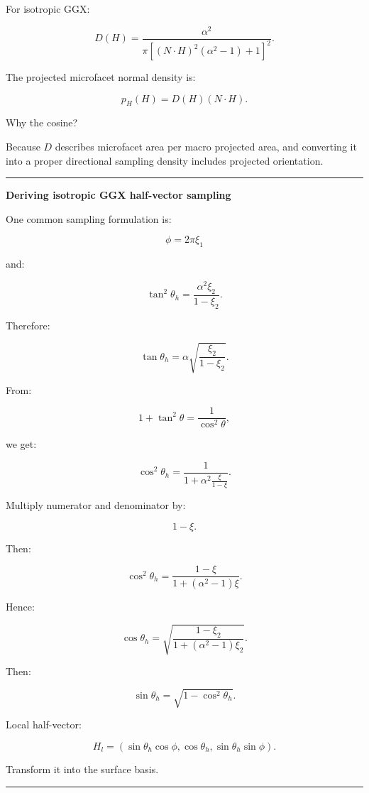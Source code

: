 For isotropic GGX:

\[
D(H)
=
\frac{
\alpha^2
}{
\pi
[
(N\cdot H)^2(\alpha^2-1)+1
]^2
}.
\]

The projected microfacet normal density is:

\[
\boxed{
p_H(H)
=
D(H)(N\cdot H).
}
\]

Why the cosine?

Because \(D\) describes microfacet area per macro projected area, and converting it into a proper directional sampling density includes projected orientation.

\begin{center}\rule{0.5\linewidth}{0.5pt}\end{center}

\textbf{Deriving isotropic GGX half-vector sampling}

One common sampling formulation is:

\[
\phi=2\pi\xi_1
\]

and:

\[
\tan^2\theta_h
=
\frac{
\alpha^2\xi_2
}{
1-\xi_2
}.
\]

Therefore:

\[
\tan\theta_h
=
\alpha
\sqrt{
\frac{\xi_2}{1-\xi_2}
}.
\]

From:

\[
1+\tan^2\theta
=
\frac1{\cos^2\theta},
\]

we get:

\[
\cos^2\theta_h
=
\frac1{
1+
\alpha^2
\frac{\xi}{1-\xi}
}.
\]

Multiply numerator and denominator by:

\[
1-\xi.
\]

Then:

\[
\boxed{
\cos^2\theta_h
=
\frac{
1-\xi
}{
1+(\alpha^2-1)\xi
}.
}
\]

Hence:

\[
\boxed{
\cos\theta_h
=
\sqrt{
\frac{
1-\xi_2
}{
1+(\alpha^2-1)\xi_2
}
}.
}
\]

Then:

\[
\sin\theta_h
=
\sqrt{
1-\cos^2\theta_h
}.
\]

Local half-vector:

\[
H_l=
(
\sin\theta_h\cos\phi,
\cos\theta_h,
\sin\theta_h\sin\phi
).
\]

Transform it into the surface basis.

\begin{center}\rule{0.5\linewidth}{0.5pt}\end{center}

